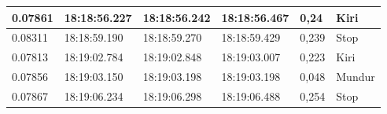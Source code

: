 \begin{longtable}{|l|l|l|l|l|l|}
  0.07861                                                                                                 & 18:18:56.227                                                                                           & 18:18:56.242                                                                                               & 18:18:56.467                                                                                            & 0,24                                               & Kiri                                              \\ \hline
  0.08311                                                                                                 & 18:18:59.190                                                                                           & 18:18:59.270                                                                                               & 18:18:59.429                                                                                            & 0,239                                              & Stop                                              \\ \hline
  0.07813                                                                                                 & 18:19:02.784                                                                                           & 18:19:02.848                                                                                               & 18:19:03.007                                                                                            & 0,223                                              & Kiri                                              \\ \hline
  0.07856                                                                                                 & 18:19:03.150                                                                                           & 18:19:03.198                                                                                               & 18:19:03.198                                                                                            & 0,048                                              & Mundur                                            \\ \hline
  0.07867                                                                                                 & 18:19:06.234                                                                                           & 18:19:06.298                                                                                               & 18:19:06.488                                                                                            & 0,254                                              & Stop                                              \\ \hline

\end{longtable}
